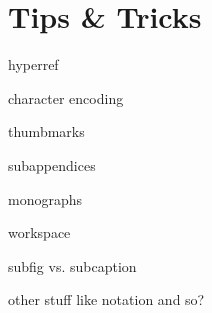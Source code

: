 \chapter{Tips \& Tricks}
\label{chap:tips_tricks}

hyperref

character encoding

thumbmarks

subappendices

monographs

workspace

subfig vs. subcaption

other stuff like notation and so?
